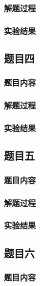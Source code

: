 \documentclass[11pt,a4paper]{ctexart}
\begin{document}
\subsubsection{解题过程}
\mbox{}

\subsubsection{实验结果}
\mbox{}

\subsection{题目四}
\subsubsection{题目内容}
\mbox{}

\subsubsection{解题过程}
\mbox{}

\subsubsection{实验结果}
\mbox{}

\subsection{题目五}
\subsubsection{题目内容}
\mbox{}

\subsubsection{解题过程}
\mbox{}

\subsubsection{实验结果}
\mbox{}

\subsection{题目六}
\subsubsection{题目内容}
\mbox{}
\end{document}
